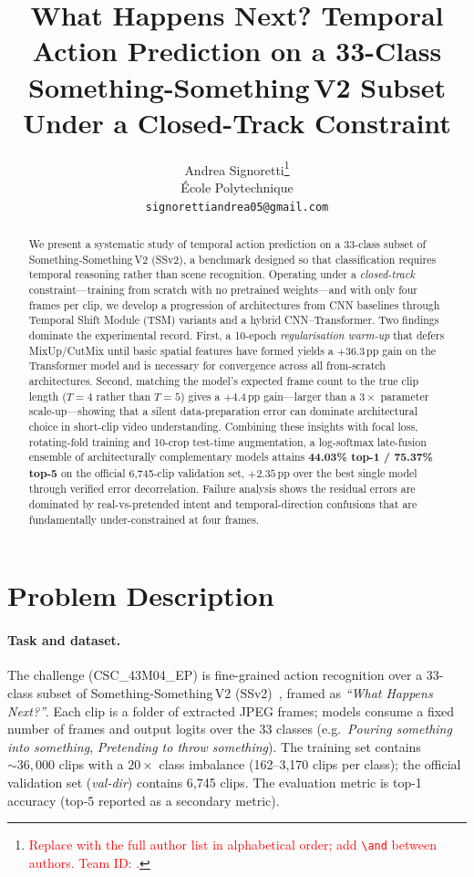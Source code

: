 \documentclass[10pt,twocolumn,letterpaper]{article}
\title{What Happens Next? Temporal Action Prediction on a 33-Class
Something-Something\,V2 Subset Under a Closed-Track Constraint}
\author{%
Andrea Signoretti\thanks{\textcolor{red}{Replace with the full author list in
alphabetical order; add \texttt{\textbackslash and} between authors. Team ID: \TEAMID.}}\\
École Polytechnique\\
{\tt\small signorettiandrea05@gmail.com}
}
\begin{document}
\maketitle

\begin{abstract}
We present a systematic study of temporal action prediction on a 33-class
subset of Something-Something\,V2 (SSv2), a benchmark designed so that
classification requires temporal reasoning rather than scene recognition.
Operating under a \emph{closed-track} constraint---training from scratch with
no pretrained weights---and with only four frames per clip, we develop a
progression of architectures from CNN baselines through Temporal Shift Module
(TSM) variants and a hybrid CNN--Transformer. Two findings dominate the
experimental record. First, a 10-epoch \emph{regularisation warm-up} that
defers MixUp/CutMix until basic spatial features have formed yields a
$+36.3$\,pp gain on the Transformer model and is necessary for convergence
across all from-scratch architectures. Second, matching the model's expected
frame count to the true clip length ($T{=}4$ rather than $T{=}5$) gives a
$+4.4$\,pp gain---larger than a $3\times$ parameter scale-up---showing that a
silent data-preparation error can dominate architectural choice in short-clip
video understanding. Combining these insights with focal loss, rotating-fold
training and 10-crop test-time augmentation, a log-softmax late-fusion ensemble
of architecturally complementary models attains \textbf{44.03\% top-1 / 75.37\%
top-5} on the official 6{,}745-clip validation set, $+2.35$\,pp over the best
single model through verified error decorrelation. Failure analysis shows the
residual errors are dominated by real-vs-pretended intent and temporal-direction
confusions that are fundamentally under-constrained at four frames.
\end{abstract}

\section{Problem Description}
\label{sec:problem}

\paragraph{Task and dataset.}
The challenge (CSC\_43M04\_EP) is fine-grained action recognition over a
33-class subset of Something-Something\,V2 (SSv2)~\cite{goyal2017ssv2}, framed
as \emph{``What Happens Next?''}. Each clip is a folder of extracted JPEG
frames; models consume a fixed number of frames and output logits over the 33
classes (e.g.\ \emph{Pouring something into something}, \emph{Pretending to
throw something}). The training set contains ${\sim}36{,}000$ clips with a
$20\times$ class imbalance (162--3{,}170 clips per class); the official
validation set (\emph{val-dir}) contains 6{,}745 clips. The evaluation metric
is top-1 accuracy (top-5 reported as a secondary metric).
\end{document}
